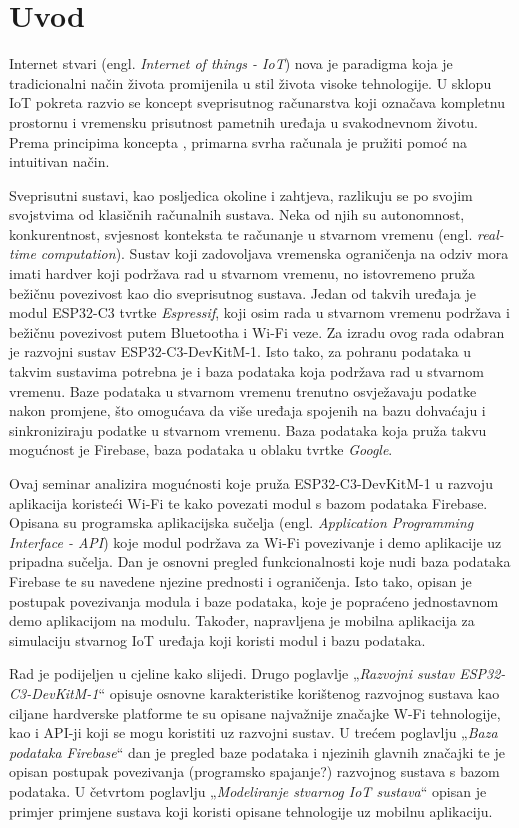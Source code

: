 \chapter{Uvod}

Internet stvari (engl. \textit{Internet of things - IoT}) nova je paradigma koja je tradicionalni način života promijenila u stil života visoke tehnologije. U sklopu IoT pokreta razvio se koncept sveprisutnog računarstva koji označava kompletnu prostornu i vremensku prisutnost pametnih uređaja u svakodnevnom životu. Prema principima koncepta \cite{sverac}, primarna svrha računala je pružiti pomoć na intuitivan način. 

Sveprisutni sustavi, kao posljedica okoline i zahtjeva, razlikuju se po svojim svojstvima od klasičnih računalnih sustava. Neka od njih su autonomnost, konkurentnost, svjesnost konteksta te računanje u stvarnom vremenu (engl. \textit{real-time computation}). Sustav koji zadovoljava vremenska ograničenja na odziv mora imati hardver koji podržava rad u stvarnom vremenu, no istovremeno pruža bežičnu povezivost kao dio sveprisutnog sustava. Jedan od takvih uređaja je modul ESP32-C3 tvrtke \textit{Espressif}, koji osim rada u stvarnom vremenu podržava i bežičnu povezivost putem Bluetootha i Wi-Fi veze. Za izradu ovog rada odabran je razvojni sustav ESP32-C3-DevKitM-1. Isto tako, za pohranu podataka u takvim sustavima potrebna je i baza podataka koja podržava rad u stvarnom vremenu. Baze podataka u stvarnom vremenu trenutno osvježavaju podatke nakon promjene, što omogućava da više uređaja spojenih na bazu dohvaćaju i sinkroniziraju podatke u stvarnom vremenu. Baza podataka koja pruža takvu mogućnost je Firebase, baza podataka u oblaku tvrtke \textit{Google}.

Ovaj seminar analizira mogućnosti koje pruža ESP32-C3-DevKitM-1 u razvoju aplikacija koristeći Wi-Fi te kako povezati modul s bazom podataka Firebase. Opisana su programska aplikacijska sučelja (engl. \textit{Application Programming Interface - API}) koje modul podržava za Wi-Fi povezivanje i demo aplikacije uz pripadna sučelja. Dan je osnovni pregled funkcionalnosti koje nudi baza podataka Firebase te su navedene njezine prednosti i ograničenja. Isto tako, opisan je postupak povezivanja modula i baze podataka, koje je popraćeno jednostavnom demo aplikacijom na modulu. Također, napravljena je mobilna aplikacija za simulaciju stvarnog IoT uređaja koji koristi modul i bazu podataka.

Rad je podijeljen u cjeline kako slijedi. Drugo poglavlje „\textit{Razvojni sustav ESP32-C3-DevKitM-1}“ opisuje osnovne karakteristike korištenog razvojnog sustava kao ciljane hardverske platforme te su opisane najvažnije značajke W-Fi tehnologije, kao i API-ji koji se mogu koristiti uz razvojni sustav. U trećem poglavlju „\textit{Baza podataka Firebase}“ dan je pregled baze podataka i njezinih glavnih značajki te je opisan postupak povezivanja (programsko spajanje?) razvojnog sustava s bazom podataka. U četvrtom poglavlju „\textit{Modeliranje stvarnog IoT sustava}“ opisan je primjer primjene sustava koji koristi opisane tehnologije uz mobilnu aplikaciju.

\eject